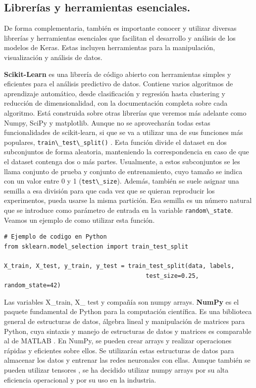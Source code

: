 \subsection{Librerías y herramientas esenciales.} \label{sec:2.3.2}

De forma complementaria, también es importante conocer y utilizar diversas librerías y herramientas esenciales que facilitan el desarrollo y análisis de los modelos de Keras. Estas incluyen herramientas para la manipulación, visualización y análisis de datos.

\textbf{Scikit-Learn} \citep{scikitlearn} es una librería de código abierto con herramientas simples y eficientes para el análisis predictivo de datos. Contiene varios algoritmos de aprendizaje automático, desde clasificación y regresión hasta clustering y reducción de dimensionalidad, con la documentación completa sobre cada algoritmo. Está construida sobre otras librerías que veremos más adelante como Numpy, SciPy y matplotlib. Aunque no se aprovecharán todas estas funcionalidades de scikit-learn, si que se va a utilizar una de sus funciones más populares, \lstinline|train\_test\_split()| \citep{traintestsplit}. Esta función divide el dataset en dos subconjuntos de forma aleatoria, manteniendo la correspondencia en caso de que el dataset contenga dos o más partes. Usualmente, a estos subconjuntos se les llama conjunto de prueba y conjunto de entrenamiento, cuyo tamaño se indica con un valor entre 0 y 1 (\lstinline|test\_size|). Además, también se suele asignar una semilla a esa división para que cada vez que se quieran reproducir los experimentos, pueda usarse la misma partición. Esa semilla es un número natural que se introduce como parámetro de entrada en la variable \lstinline|random\_state|. Veamos un ejemplo de como utilizar esta función.


\lstset{language=Python}
\begin{lstlisting}
# Ejemplo de codigo en Python
from sklearn.model_selection import train_test_split

X_train, X_test, y_train, y_test = train_test_split(data, labels,
                                        test_size=0.25, random_state=42)
\end{lstlisting}


Las variables X\_train, X\_ test y compañía son numpy arrays. \textbf{NumPy} \citep{numpy} es el paquete fundamental de Python para la computación científica. Es una biblioteca general de estructuras de datos, álgebra lineal y manipulación de matrices para Python, cuya sintaxis y manejo de estructuras de datos y matrices es comparable al de MATLAB \citep{bloice2016tutorial}. En NumPy, se pueden crear arrays y realizar operaciones rápidas y eficientes sobre ellos. Se utilizarán estas estructuras de datos para almacenar los datos y entrenar las redes neuronales con ellas. Aunque también se pueden utilizar tensores \citep{modeltraining}, se ha decidido utilizar numpy arrays por su alta eficiencia operacional y por su uso en la industria.


